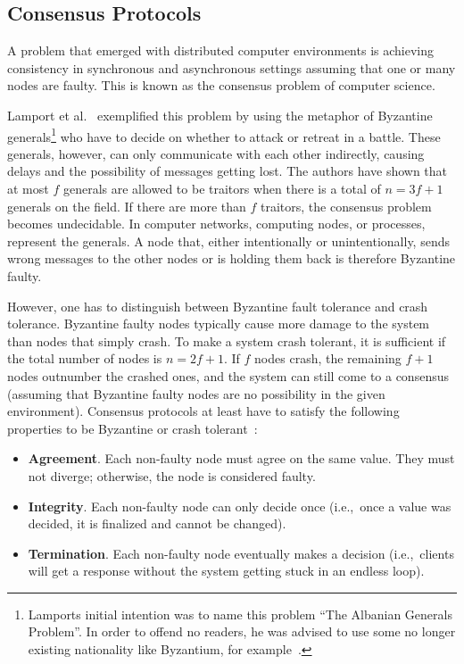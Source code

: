 \subsection{Consensus Protocols}
\label{sec:background:blockchain:consensus-protocols}
A problem that emerged with distributed computer environments is achieving consistency in synchronous and asynchronous settings assuming that one or many nodes are faulty. This is known as the consensus problem of computer science.

Lamport et al.~\cite{lamport2002} exemplified this problem by using the metaphor of Byzantine generals\footnote{Lamports initial intention was to name this problem ``The Albanian Generals Problem''. In order to offend no readers, he was advised to use some no longer existing nationality like Byzantium, for example~\cite{kleppmann17desig}.} who have to decide on whether to attack or retreat in a battle. These generals, however, can only communicate with each other indirectly, causing delays and the possibility of messages getting lost. The authors have shown that at most $f$ generals are allowed to be traitors when there is a total of $n=3f+1$ generals on the field. If there are more than $f$ traitors, the consensus problem becomes undecidable. In computer networks, computing nodes, or processes, represent the generals. A node that, either intentionally or unintentionally, sends wrong messages to the other nodes or is holding them back is therefore Byzantine faulty.

However, one has to distinguish between Byzantine fault tolerance and crash tolerance. Byzantine faulty nodes typically cause more damage to the system than nodes that simply crash. To make a system crash tolerant, it is sufficient if the total number of nodes is $n=2f+1$. If $f$ nodes crash, the remaining $f+1$ nodes outnumber the crashed ones, and the system can still come to a consensus (assuming that Byzantine faulty nodes are no possibility in the given environment). Consensus protocols at least have to satisfy the following properties to be Byzantine or crash tolerant~\cite{sousa12from_byzan_consen_bft_state_machin_replic}:

\begin{itemize}
\item \textbf{Agreement}. Each non-faulty node must agree on the same value. They must not diverge; otherwise, the node is considered faulty.
\item \textbf{Integrity}. Each non-faulty node can only decide once (i.e.,\ once a value was decided, it is finalized and cannot be changed).
\item \textbf{Termination}. Each non-faulty node eventually makes a decision (i.e.,\ clients will get a response without the system getting stuck in an endless loop).
\end{itemize}

